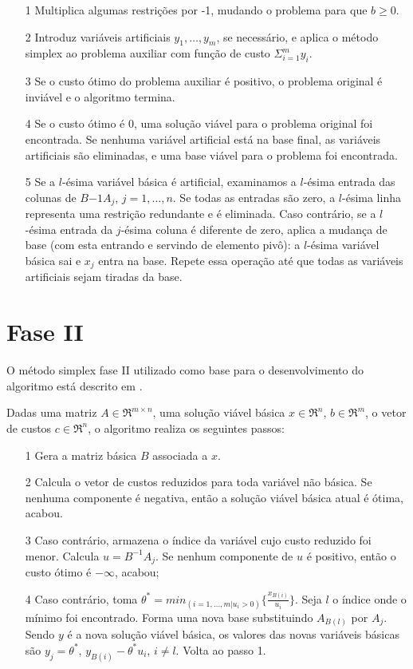 \documentclass[
	12pt,				%
	openright,			%
	oneside,			%
	a4paper,			%
	english,			%
	french,				%
	spanish,			%
	brazil,				%
	]{abntex2}
\begin{document}
\begin{itemize}
\item[1] Multiplica algumas restrições por -1, mudando o problema para que $b \geq 0$.

\item[2] Introduz variáveis artificiais $y_1, \ldots, y_m$, se necessário, e aplica o método simplex ao problema auxiliar com função de custo $ \Sigma_{i=1}^{m}y_i $.

\item[3] Se o custo ótimo do problema auxiliar é positivo, o problema original é inviável e o algoritmo termina.

\item[4] Se o custo ótimo é 0, uma solução viável para o problema original foi encontrada. Se nenhuma variável artificial está na base final, as variáveis artificiais são eliminadas, e uma base viável para o problema foi encontrada.

\item[5] Se a $l$-ésima variável básica é artificial, examinamos a $l$-ésima entrada das colunas de $B{-1}A_j$, $j = 1, \ldots, n$. Se todas as entradas são zero, a $l$-ésima linha representa uma restrição redundante e é eliminada. Caso contrário, se a $l$-ésima entrada da $j$-ésima coluna é diferente de zero, aplica a mudança de base (com esta entrando e servindo de elemento pivô): a $l$-ésima variável básica sai e $x_j$ entra na base. Repete essa operação até que todas as variáveis artificiais sejam tiradas da base. 
\end{itemize}

\section{Fase II}
O método simplex fase II utilizado como base para o desenvolvimento do algoritmo está descrito em
  . 
  
  Dadas uma matriz $A \in \Re ^{m \times n}$, uma solução viável básica $x \in \Re ^n$, $b \in \Re ^m$, o vetor de custos $c \in\Re ^n$, o algoritmo realiza os seguintes passos:
  
\begin{itemize}
\item[1] Gera a matriz básica $B$ associada a $x$.
\item[2] Calcula o vetor de custos reduzidos para toda variável não
 básica. Se nenhuma componente é negativa, então a solução viável básica atual é
 ótima, acabou. 
\item[3]Caso contrário, armazena o índice da variável cujo custo reduzido foi menor.
Calcula $u = B^{-1}A_j$. Se nenhum componente de $u$ é positivo,
então o custo ótimo é $- \infty$, acabou;
\item[4]Caso contrário, toma $\theta ^* = min_{(i = 1,\ldots,m|u_i > 0)} \{\frac{x_{B(i)}}{u_i}\} $.
Seja $l$ o índice onde o mínimo foi encontrado. Forma uma nova
base substituindo $A_{B(l)}$ por $A_j$. Sendo $y$ é a nova solução viável básica, os valores
das novas variáveis básicas são $y_j = \theta ^*$, $y_{B(i)} - \theta ^* u_i$, $i\neq l$. Volta ao passo 1.
\end{itemize}
\end{document}

